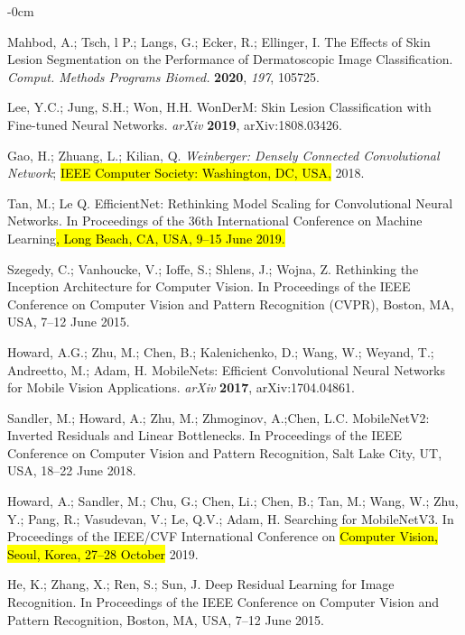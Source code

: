 \documentclass[sensors,article,accept,pdftex,moreauthors]{Definitions/mdpi}
\begin{document}
\begin{adjustwidth}{-\extralength}{0cm}
\begin{thebibliography}{999}
Mahbod, A.; Tsch, l P.; Langs, G.; Ecker, R.; Ellinger, I.  The Effects of Skin Lesion Segmentation on the Performance of Dermatoscopic Image Classification.
{\em Comput. Methods Programs Biomed.} 
{\bf 2020}, \emph{197}, 105725.

Lee, Y.C.; Jung, S.H.; Won, H.H. WonDerM: Skin Lesion Classification with Fine-tuned Neural Networks.
{\em arXiv} 
{\bf 2019}, arXiv:1808.03426.

{Gao, H.; Zhuang, L.; Kilian, Q.  \emph{Weinberger: Densely Connected Convolutional Network};} 
{\hl{IEEE Computer Society: Washington, DC, USA,}} 
{2018}.

Tan, M.; Le Q. EfficientNet: Rethinking Model Scaling for Convolutional Neural Networks.
In Proceedings of the 36th {International Conference on Machine Learning}\hl{, Long Beach, CA, USA, 9--15 June 2019.}

Szegedy, C.; Vanhoucke, V.; Ioffe, S.; Shlens, J.; Wojna, Z.  Rethinking the Inception Architecture for Computer Vision.
In Proceedings of the IEEE Conference on Computer Vision and Pattern {Recognition (CVPR),} Boston, MA, USA, 7--12 June 
{2015}.

Howard, A.G.; Zhu, M.; Chen, B.; Kalenichenko, D.; Wang, W.;  Weyand, T.;  Andreetto, M.; Adam, H. MobileNets: Efficient Convolutional Neural Networks for Mobile Vision Applications.
{\em arXiv} 
{\bf 2017}, arXiv:1704.04861.

Sandler, M.; Howard, A.; Zhu, M.; Zhmoginov, A.;Chen, L.C. MobileNetV2: Inverted Residuals and Linear Bottlenecks.
In Proceedings of the IEEE Conference on Computer Vision and {Pattern Recognition,} Salt Lake City, UT, USA, 18--22 June 
{2018}.

Howard, A.; Sandler, M.; Chu, G.; Chen, Li.; Chen, B.; Tan, M.; Wang, W.; Zhu, Y.; Pang, R.; Vasudevan, V.; Le, Q.V.; Adam, H. Searching for MobileNetV3.
In Proceedings of the IEEE/CVF International Conference on \hl{Computer Vision, Seoul, Korea, 27--28 October } %
{2019}.

He, K.; Zhang, X.; Ren, S.; Sun, J. Deep Residual Learning for Image Recognition.
In Proceedings of the IEEE Conference on Computer Vision and {Pattern Recognition, } Boston, MA, USA, 7--12 June 
{2015}.


\end{thebibliography}
\end{adjustwidth}
\end{document}
